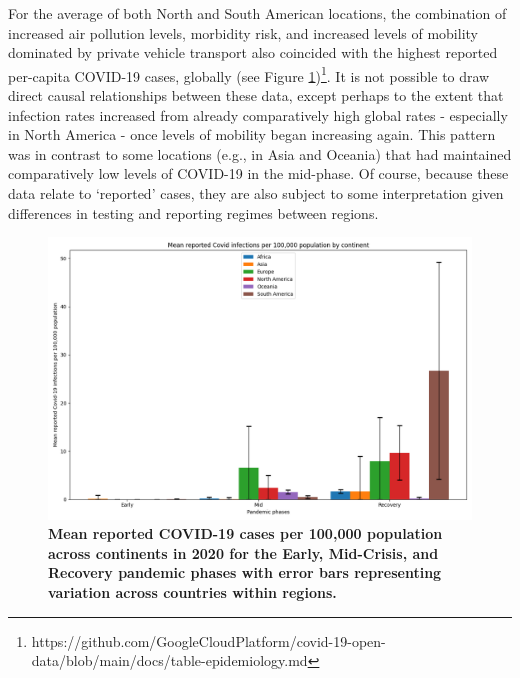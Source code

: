 \documentclass[preprint,10pt]{elsarticle} %
\begin{document}
For the average of both North and South American locations, the combination of increased air pollution levels, morbidity risk, and increased levels of mobility dominated by private vehicle transport also coincided with the highest reported per-capita COVID-19 cases, globally (see Figure \ref{fig:covidCases7Ave})\footnote{https://github.com/GoogleCloudPlatform/covid-19-open-data/blob/main/docs/table-epidemiology.md}. It is not possible to draw direct causal relationships between these data, except perhaps to the extent that infection rates increased from already comparatively high global rates - especially in North America - once levels of mobility began increasing again. This pattern was in contrast to some locations (e.g., in Asia and Oceania) that had maintained comparatively low levels of COVID-19 in the mid-phase. Of course, because these data relate to `reported' cases, they are also subject to some interpretation given differences in testing and reporting regimes between regions.

\begin{figure}
\centering

\includegraphics[trim={0 0 0 0},clip,scale=0.5]{Images/Average_Covid_Cases_Plot.png}
\caption{\bf Mean reported COVID-19 cases per 100,000 population across continents in 2020 for the Early, Mid-Crisis, and Recovery pandemic phases with error bars representing variation across countries within regions.}  
 \label{fig:covidCases7Ave}
\end{figure}
\end{document}
